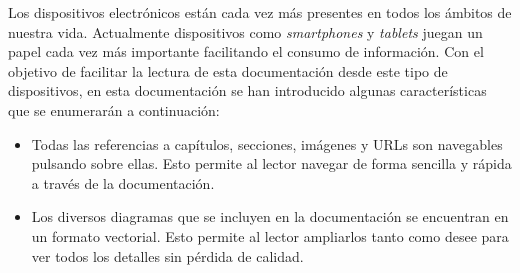 Los dispositivos electrónicos están cada vez más presentes en todos los ámbitos de nuestra vida.  Actualmente dispositivos como \textit{smartphones} y \textit{tablets} juegan un papel cada vez más importante facilitando el consumo de información.  Con el objetivo de facilitar la lectura de esta documentación desde este tipo de dispositivos, en esta documentación se han introducido algunas características que se enumerarán a continuación:
\begin{itemize}
	\item
		Todas las referencias a capítulos, secciones, imágenes y URLs son navegables pulsando sobre ellas.  Esto permite al lector navegar de forma sencilla y rápida a través de la documentación.
	\item
		Los diversos diagramas que se incluyen en la documentación se encuentran en un formato vectorial.  Esto permite al lector ampliarlos tanto como desee para ver todos los detalles sin pérdida de calidad.
\end{itemize}
